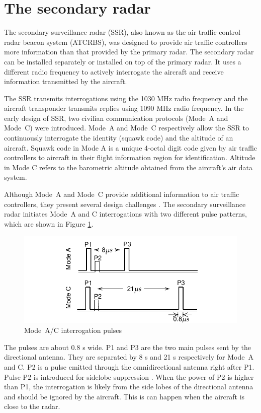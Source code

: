 \section{The secondary radar}

The secondary surveillance radar (SSR), also known as the air traffic control radar beacon system (ATCRBS), was designed to provide air traffic controllers more information than that provided by the primary radar. The secondary radar can be installed separately or installed on top of the primary radar. It uses a different radio frequency to actively interrogate the aircraft and receive information transmitted by the aircraft.

The SSR transmits interrogations using the 1030 MHz radio frequency and the aircraft transponder transmits replies using 1090 MHz radio frequency. In the early design of SSR, two civilian communication protocols (Mode~A and Mode~C) were introduced. Mode~A and Mode~C respectively allow the SSR to continuously interrogate the identity (squawk code) and the altitude of an aircraft. Squawk code in Mode A is a unique 4-octal digit code given by air traffic controllers to aircraft in their flight information region for identification. Altitude in Mode C refers to the barometric altitude obtained from the aircraft's air data system. 

Although Mode~A and Mode~C provide additional information to air traffic controllers, they present several design challenges \cite{icao1983}. The secondary surveillance radar initiates Mode~A and C interrogations with two different pulse patterns, which are shown in Figure \ref{fig:mode_ac_uplink_pulses}.

\begin{figure}[ht]
  \includegraphics[scale=0.8]{figures/intro/mode_ac_uplink_pulses.pdf}
  \caption{Mode~A/C interrogation pulses}
  \label{fig:mode_ac_uplink_pulses}
\end{figure}

The pulses are about 0.8 {\textmu}s wide. P1 and P3 are the two main pulses sent by the directional antenna. They are separated by 8 {\textmu}s and 21 {\textmu}s respectively for Mode~A and C. P2 is a pulse emitted through the omnidirectional antenna right after P1. Pulse P2 is introduced for sidelobe suppression \cite{orlando1989}. When the power of P2 is higher than P1, the interrogation is likely from the side lobes of the directional antenna and should be ignored by the aircraft. This is can happen when the aircraft is close to the radar.

